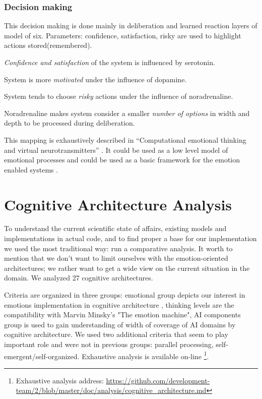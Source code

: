\subsubsection{Decision making}

This decision making is done mainly in deliberation and learned reaction layers of model of six.
Parameters: confidence, satisfaction, risky are used to highlight actions stored(remembered).

\emph{Confidence and satisfaction} of the system is influenced by serotonin.

System is more \emph{motivated} under the influence of dopamine.

System tends to choose \emph{risky} actions under the influence of noradrenaline.

Noradrenaline makes system consider a smaller \emph{number of options} in width and depth to be processed during deliberation.

This mapping is exhaustively described in ``Computational emotional thinking and virtual neurotransmitters'' \cite{computational_emotional_thinking}. It could be used as a low level model of emotional processes and could be used as a basic framework for the emotion enabled systems \cite{whatdoesitmeanforcomputer}.

\section{Cognitive Architecture Analysis}

To understand the current scientific state of affairs, existing models and implementations in actual code, and to find proper a base for our implementation we used the most traditional way: run a comparative analysis. It worth to mention that we don't want to limit ourselves with the emotion-oriented architectures; we rather want to get a wide view on the current situation in the domain. We analyzed 27 cognitive architectures.

Criteria are organized in three groups: emotional group depicts our interest in emotions implementation in cognitive architecture \cite{computationalmodelsemotionscognition}, thinking levels are the compatibility with Marvin Minsky's "The emotion machine", AI components group is used to gain understanding of width of coverage of AI domains by cognitive architecture. We used two additional criteria that seem to play important role and were not in previous groups: parallel processing, self-emergent/self-organized. Exhaustive analysis is available on-line \footnote{Exhaustive analysis address: \url{https://github.com/development-team/2/blob/master/doc/analysis/cognitive_architecture.md}}.

